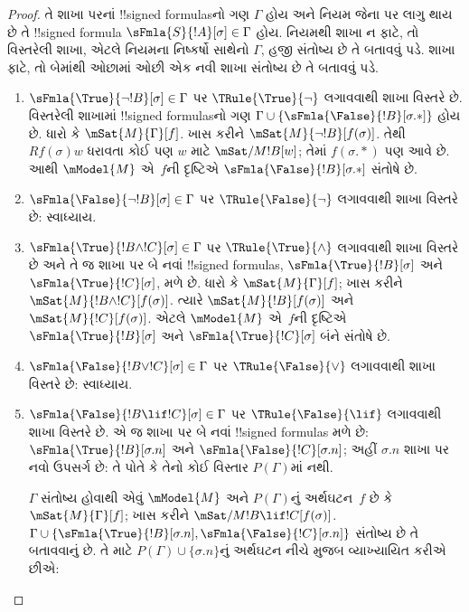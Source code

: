 \documentclass[../../../include/open-logic-section]{subfiles}
\begin{document}
\begin{proof}
તે શાખા પરનાં !!{signed formula}sનો ગણ
$\Gamma$ હોય અને નિયમ જેના પર લાગુ થાય છે તે
!!{signed formula} $\sFmla{S}{!A}[\sigma] \in \Gamma$
હોય. નિયમથી શાખા ન ફાટે, તો વિસ્તરેલી શાખા,
એટલે નિયમના નિષ્કર્ષો સાથેનો $\Gamma$,
હજી સંતોષ્ય છે તે બતાવવું પડે. શાખા ફાટે,
તો બેમાંથી ઓછામાં ઓછી એક નવી શાખા સંતોષ્ય
છે તે બતાવવું પડે.
\begin{enumerate}
\item $\sFmla{\True}{\lnot !B}[\sigma] \in \Gamma$
  પર $\TRule{\True}{\lnot}$ લગાવવાથી શાખા
  વિસ્તરે છે. વિસ્તરેલી શાખામાં
  !!{signed formula}sનો ગણ $\Gamma \cup
  \{\sFmla{\False}{!B}[\sigma.{*}]\}$ હોય છે.
  ધારો કે $\mSat{M}{\Gamma}[f]$. ખાસ કરીને
  $\mSat{M}{\lnot !B}[f(\sigma)]$. તેથી
  $Rf(\sigma)w$ ધરાવતા કોઈ પણ $w$ માટે
  $\mSat/{M}{!B}[w]$; તેમાં $f(\sigma.{*})$
  પણ આવે છે. આથી $\mModel{M}$ એ~$f$ની
  દૃષ્ટિએ $\sFmla{\False}{!B}[\sigma.{*}]$
  સંતોષે છે.
\item $\sFmla{\False}{\lnot !B}[\sigma] \in \Gamma$
  પર $\TRule{\False}{\lnot}$ લગાવવાથી શાખા
  વિસ્તરે છે: સ્વાધ્યાય.
\item $\sFmla{\True}{!B \land !C}[\sigma] \in \Gamma$
  પર $\TRule{\True}{\land}$ લગાવવાથી શાખા
  વિસ્તરે છે અને તે જ શાખા પર બે નવાં
  !!{signed formula}s, $\sFmla{\True}{!B}[\sigma]$
  અને $\sFmla{\True}{!C}[\sigma]$, મળે છે.
  ધારો કે $\mSat{M}{\Gamma}[f]$; ખાસ કરીને
  $\mSat{M}{!B \land !C}[f(\sigma)]$.
  ત્યારે $\mSat{M}{!B}[f(\sigma)]$ અને
  $\mSat{M}{!C}[f(\sigma)]$. એટલે
  $\mModel{M}$ એ~$f$ની દૃષ્ટિએ
  $\sFmla{\True}{!B}[\sigma]$ અને
  $\sFmla{\True}{!C}[\sigma]$ બંને સંતોષે છે.
\item $\sFmla{\False}{!B \lor !C}[\sigma] \in \Gamma$
  પર $\TRule{\False}{\lor}$ લગાવવાથી શાખા
  વિસ્તરે છે: સ્વાધ્યાય.
\item $\sFmla{\False}{!B \lif !C}[\sigma] \in \Gamma$
  પર $\TRule{\False}{\lif}$ લગાવવાથી શાખા
  વિસ્તરે છે. એ જ શાખા પર બે નવાં
  !!{signed formula}s મળે છે:
  $\sFmla{\True}{!B}[\sigma.n]$ અને
  $\sFmla{\False}{!C}[\sigma.n]$; અહીં
  $\sigma.n$ શાખા પર નવો ઉપસર્ગ છે: તે પોતે કે
  તેનો કોઈ વિસ્તાર $P(\Gamma)$માં નથી.

  $\Gamma$ સંતોષ્ય હોવાથી એવું
  $\mModel{M}$ અને $P(\Gamma)$નું અર્થઘટન~$f$
  છે કે $\mSat{M}{\Gamma}[f]$; ખાસ કરીને
  $\mSat/{M}{!B \lif !C}[f(\sigma)]$.
  $\Gamma \cup \{\sFmla{\True}{!B}[\sigma.n],
  \sFmla{\False}{!C}[\sigma.n]\}$ સંતોષ્ય છે
  તે બતાવવાનું છે. તે માટે $P(\Gamma)
  \cup \{\sigma.n\}$નું અર્થઘટન નીચે મુજબ
  વ્યાખ્યાયિત કરીએ છીએ:


\end{enumerate}
\end{proof}
\end{document}
